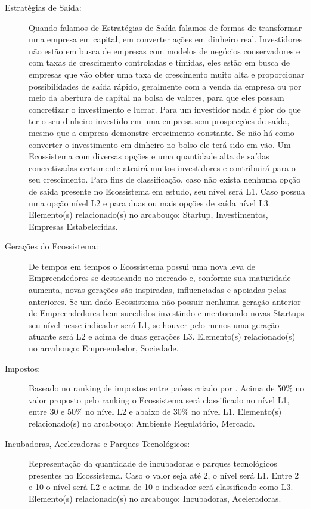 \begin{description}
  \item [Estratégias de Saída:] Quando falamos de Estratégias de Saída falamos de formas de transformar uma empresa em capital, em converter ações em dinheiro real. Investidores não estão em busca de empresas com modelos de negócios conservadores e com taxas de crescimento controladas e tímidas, eles estão em busca de empresas que vão obter uma taxa de crescimento muito alta e proporcionar possibilidades de saída rápido, geralmente com a venda da empresa ou por meio da abertura de capital na bolsa de valores, para que eles possam concretizar o investimento e lucrar. Para um investidor nada é pior do que ter o seu dinheiro investido em uma empresa sem prospecções de saída, mesmo que a empresa demonstre crescimento constante. Se não há como converter o investimento em dinheiro no bolso ele terá sido em vão. Um Ecossistema com diversas opções e uma quantidade alta de saídas concretizadas certamente atrairá muitos investidores e contribuirá para o seu crescimento. Para fins de classificação, caso não exista nenhuma opção de saída presente no Ecossistema em estudo, seu nível será L1. Caso possua uma opção nível L2 e para duas ou mais opções de saída nível L3. Elemento(s) relacionado(s) no arcabouço: Startup, Investimentos, Empresas Estabelecidas.
  
  \item [Gerações do Ecossistema:] De tempos em tempos o Ecossistema possui uma nova leva de Empreendedores se destacando no mercado e, conforme sua maturidade aumenta, novas gerações são inspiradas, influenciadas e apoiadas pelas anteriores. Se um dado Ecossistema não possuir nenhuma geração anterior de Empreendedores bem sucedidos investindo e mentorando novas Startups seu nível nesse indicador será L1, se houver pelo menos uma geração atuante será L2 e acima de duas gerações L3. Elemento(s) relacionado(s) no arcabouço: Empreendedor, Sociedade.
  
  \item [Impostos:] Baseado no ranking de impostos entre países criado por . Acima de 50\% no valor proposto pelo ranking o Ecossistema será classificado no nível L1, entre 30 e 50\% no nível L2 e abaixo de 30\% no nível L1. Elemento(s) relacionado(s) no arcabouço: Ambiente Regulatório, Mercado.
  
  \item [Incubadoras, Aceleradoras e Parques Tecnológicos:] Representação da quantidade de incubadoras e parques tecnológicos presentes no Ecossistema. Caso o valor seja até 2, o nível será L1. Entre 2 e 10 o nível será L2 e acima de 10 o indicador será classificado como L3. Elemento(s) relacionado(s) no arcabouço: Incubadoras, Aceleradoras.
  

\end{description}

